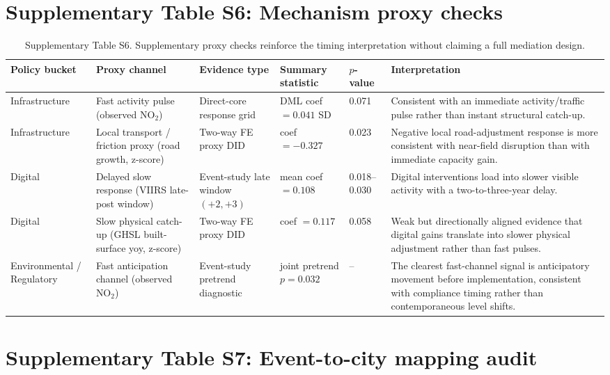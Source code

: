 \documentclass[oneside,pdflatex,sn-nature]{sn-jnl}
\begin{document}
\section{Supplementary Table S6: Mechanism proxy checks}

\begin{table}[H]
\centering
\caption{Supplementary Table S6. Supplementary proxy checks reinforce the timing interpretation without claiming a full mediation design.}
\small
\setlength{\tabcolsep}{4pt}
\begin{tabular}{p{}p{}p{}p{}p{}p{}}
\toprule
Policy bucket & Proxy channel & Evidence type & Summary statistic & $p$-value & Interpretation \\
\midrule
Infrastructure & Fast activity pulse (observed NO$_2$) & Direct-core response grid & DML coef $=0.041$ SD & 0.071 & Consistent with an immediate activity/traffic pulse rather than instant structural catch-up. \\
Infrastructure & Local transport / friction proxy (road growth, z-score) & Two-way FE proxy DID & coef $=-0.327$ & 0.023 & Negative local road-adjustment response is more consistent with near-field disruption than with immediate capacity gain. \\
Digital & Delayed slow response (VIIRS late-post window) & Event-study late window $(+2,+3)$ & mean coef $=0.108$ & 0.018--0.030 & Digital interventions load into slower visible activity with a two-to-three-year delay. \\
Digital & Slow physical catch-up (GHSL built-surface yoy, z-score) & Two-way FE proxy DID & coef $=0.117$ & 0.058 & Weak but directionally aligned evidence that digital gains translate into slower physical adjustment rather than fast pulses. \\
Environmental / Regulatory & Fast anticipation channel (observed NO$_2$) & Event-study pretrend diagnostic & joint pretrend $p=0.032$ & -- & The clearest fast-channel signal is anticipatory movement before implementation, consistent with compliance timing rather than contemporaneous level shifts. \\
\bottomrule
\end{tabular}
\end{table}
\FloatBarrier

\section{Supplementary Table S7: Event-to-city mapping audit}
\end{document}
